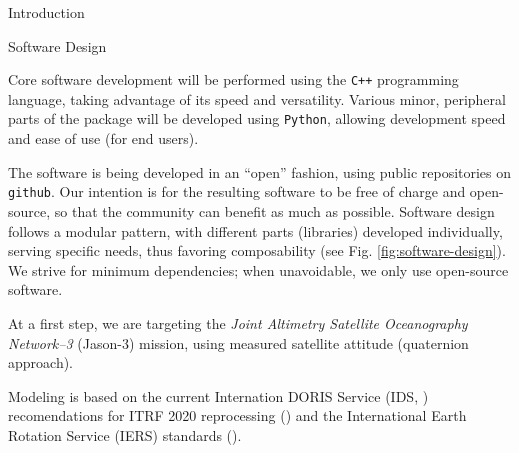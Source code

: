 \documentclass[final,a0,portrait]{beamer}
\newlength{\onecolwid}
\begin{document}
\begin{frame}[t]
\begin{columns}[t]
\begin{column}{\onecolwid}
\begin{block}{Introduction}
\end{block}
\begin{block}{Software Design}
{\small
Core software development will be performed using the \texttt{C++} programming 
language, taking advantage of its speed and versatility. Various minor, 
peripheral parts of the package will be developed using \texttt{Python}, 
allowing development speed and ease of use (for end users).\hfill \break

The software is being developed in an ``open'' fashion, using public 
repositories on \texttt{github}. Our intention is for the resulting software 
to be free of charge and open-source, so that the community can benefit as 
much as possible. Software design follows a modular pattern, with different parts 
(libraries) developed individually, serving specific needs, thus favoring 
composability (see Fig. \ref{fig:software-design}). We strive for minimum 
dependencies; when unavoidable, we only use open-source software. \hfill \break

At a first step, we are targeting the \emph{Joint Altimetry Satellite 
Oceanography Network–3} (Jason-3) mission, using measured satellite attitude 
(quaternion approach). \hfill \break

Modeling is based on the current Internation DORIS Service (IDS, \cite{10.1007/1345_2015_164} ) recomendations 
for ITRF 2020 reprocessing (\cite{ids-itrf2020-recommendations}) and the 
International Earth Rotation Service (IERS) standards (\cite{iers2010}).
}
\end{block}




\end{column}
\end{columns}
\end{frame}
\end{document}
